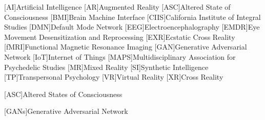 \documentclass{UIdahoMastersThesis}
\begin{document}
\begin{acronym}[MAPS]  %
	[{\textup{AI}}]{Artificial Intelligence}
	[{\textup{AR}}]{Augmented Reality}
	[{\textup{ASC}}]{Altered State of Consciousness}
	[{\textup{BMI}}]{Brain Machine Interface}	
	[{\textup{CIIS}}]{California Institute of Integral Studies}
	[{\textup{DMN}}]{Default Mode Network}	
	[{\textup{EEG}}]{Electroencephalography}
	[{\textup{EMDR}}]{Eye Movement Desensitization and Reprocessing}
	[{\textup{EXR}}]{Ecstatic Cross Reality}	
	[{\textup{fMRI}}]{Functional Magnetic Resonance Imaging}
	[{\textup{GAN}}]{Generative Adversarial Network}	
	[{\textup{IoT}}]{Internet of Things}			
	[{\textup{MAPS}}]{Multidisciplinary Association for Psychedelic Studies}
	[{\textup{MR}}]{Mixed Reality}
	[{\textup{SI}}]{Synthetic Intelligence}	
	[{\textup{TP}}]{Transpersonal Psychology}
	[{\textup{VR}}]{Virtual Reality}
	[{\textup{XR}}]{Cross Reality}

	


	[{\textup{ASC}}]{Altered States of Consciousness}







	[GANs]{Generative Adversarial Network}  %
	
\end{acronym}



\mainmatter  %
\setcounter{secnumdepth}{2}  %




\clearpage
\end{document}
